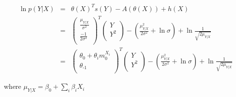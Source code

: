 \documentclass[11pt, oneside]{article}   	%
\numberwithin{figure}{section}
\numberwithin{equation}{section}
\numberwithin{table}{section}
\begin{document}
\begin{eqnarray*}
\ln p(Y|X) &=& \theta(X)^T s(Y) - A(\theta(X)) + h(X)\\
&=&
\begin{pmatrix}
\frac{\mu_{Y|X}}{\sigma^2}\\
\frac{-1}{2\sigma^2}\\
\end{pmatrix}^T
\begin{pmatrix}
Y\\
Y^2\\
\end{pmatrix}
- \left(\frac{\mu_{Y|X}^2}{2\sigma^2} + \ln{\sigma}\right) + \ln{\frac{1}{\sqrt{2\mu_{Y|X}}}} \\
&=&
\begin{pmatrix}
\theta_0+\theta_i m_0^{X_i}\\
\theta_{\mbox{-}1}\\
\end{pmatrix}^T
\begin{pmatrix}
Y\\
Y^2\\
\end{pmatrix}
- \left(\frac{\mu_{Y|X}^2}{2\sigma^2} + \ln{\sigma}\right) + \ln{\frac{1}{\sqrt{2\mu_{Y|X}}}} 
\end{eqnarray*}

where $\mu_{Y|X} = \beta_0+\sum_i{\beta_i X_i}$
\end{document}
